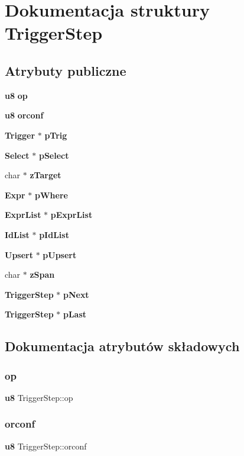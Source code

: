 \section{Dokumentacja struktury Trigger\+Step}
\label{struct_trigger_step}
\subsection*{Atrybuty publiczne}
\begin{DoxyCompactItemize}
\item 
\textbf{ u8} \textbf{ op}
\item 
\textbf{ u8} \textbf{ orconf}
\item 
\textbf{ Trigger} $\ast$ \textbf{ p\+Trig}
\item 
\textbf{ Select} $\ast$ \textbf{ p\+Select}
\item 
char $\ast$ \textbf{ z\+Target}
\item 
\textbf{ Expr} $\ast$ \textbf{ p\+Where}
\item 
\textbf{ Expr\+List} $\ast$ \textbf{ p\+Expr\+List}
\item 
\textbf{ Id\+List} $\ast$ \textbf{ p\+Id\+List}
\item 
\textbf{ Upsert} $\ast$ \textbf{ p\+Upsert}
\item 
char $\ast$ \textbf{ z\+Span}
\item 
\textbf{ Trigger\+Step} $\ast$ \textbf{ p\+Next}
\item 
\textbf{ Trigger\+Step} $\ast$ \textbf{ p\+Last}
\end{DoxyCompactItemize}


\subsection{Dokumentacja atrybutów składowych}
\mbox{\label{struct_trigger_step_a20269855c80d869d498fcb93401832fd}} 
\subsubsection{op}
{\footnotesize\ttfamily \textbf{ u8} Trigger\+Step\+::op}

\mbox{\label{struct_trigger_step_a4ed8b2571fde96e84f637184453e73e3}} 
\subsubsection{orconf}
{\footnotesize\ttfamily \textbf{ u8} Trigger\+Step\+::orconf}

